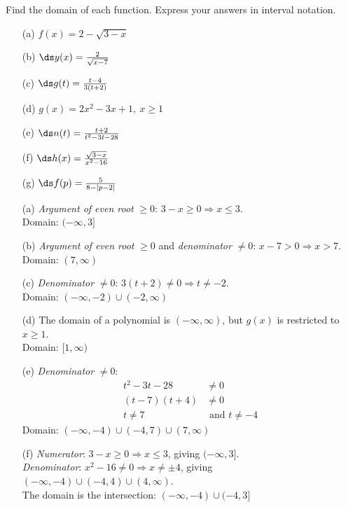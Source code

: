 \documentclass{ximera}
\begin{document}
\begin{problem}
Find the domain of each function. Express your answers in interval notation.
\begin{enumerate}
  \item[(a)] $f(x) = 2-\sqrt{3-x}$
  \medskip
  \item[(b)] $\ds y(x) = \frac{2}{\sqrt{x-7}}$
  \medskip
  \item[(c)] $\ds g(t) = \frac{t-4}{3(t+2)}$
  \medskip
  \item[(d)] $g(x) = 2x^2-3x+1,\ x \geq 1$
  \medskip
  \item[(e)] $\ds n(t) = \frac{t+2}{t^2-3t-28}$
  \medskip
  \item[(f)] $\ds h(x) = \frac{\sqrt{3-x}}{x^2-16}$
  \medskip
  \item[(g)] $\ds f(p) = \frac{5}{8-|p-2|}$
\end{enumerate}

\begin{solution}
\begin{enumerate}
  \item[(a)] \textit{Argument of even root} $\geq 0$: $3-x \geq 0 \Rightarrow x \leq 3$.\\
  Domain: $(-\infty,3]$

  \item[(b)] \textit{Argument of even root} $\geq 0$ and \textit{denominator} $\neq 0$: $x-7 > 0 \Rightarrow x > 7$.\\
  Domain: $(7,\infty)$

  \item[(c)] \textit{Denominator} $\neq 0$: $3(t+2)\neq 0 \Rightarrow t \neq -2$.\\
  Domain: $(-\infty,-2)\cup(-2,\infty)$

  \item[(d)] The domain of a polynomial is $(-\infty,\infty)$, but $g(x)$ is restricted to $x\geq 1$.\\
  Domain: $[1,\infty)$

  \item[(e)] \textit{Denominator} $\neq 0$:
  \begin{align*}
    t^2-3t-28 &\neq 0\\
    (t-7)(t+4) &\neq 0\\
    t \neq 7 &\text{ and } t \neq -4
  \end{align*}
  Domain: $(-\infty,-4)\cup(-4,7)\cup(7,\infty)$

  \item[(f)] \textit{Numerator}: $3-x \geq 0 \Rightarrow x \leq 3$, giving $(-\infty,3]$.\\
  \textit{Denominator}: $x^2-16 \neq 0 \Rightarrow x \neq \pm 4$, giving $(-\infty,-4)\cup(-4,4)\cup(4,\infty)$.\\
  The domain is the intersection: $(-\infty,-4)\cup(-4,3]$


\end{enumerate}
\end{solution}
\end{problem}
\end{document}
